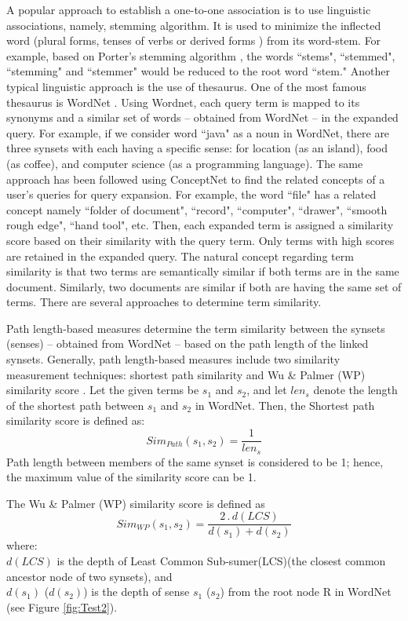 A popular approach to establish a one-to-one association is to use linguistic associations, namely, stemming algorithm. It is used to minimize the inflected word (plural forms, tenses of verbs or derived forms ) from its word-stem. For example, based on Porter's stemming algorithm \cite{porter1980algorithm}, the words ``stems", ``stemmed", ``stemming" and ``stemmer" would be reduced to the root word ``stem." Another typical linguistic approach is the use of thesaurus. One of the most famous thesaurus is WordNet \cite{voorhees1994query}. Using Wordnet, each query term is mapped to its synonyms and a similar set of words -- obtained from WordNet -- in the expanded query. For example, if we consider word ``java" as a noun  in WordNet, there are three synsets with  each having a specific sense: for location (as an island), food (as coffee), and computer science (as a programming language). The same approach has been followed using ConceptNet \cite{hsu2006query} to find the related concepts of a user's queries for query expansion. For example, the word ``file" has a related concept namely ``folder of document", ``record", ``computer", ``drawer", ``smooth rough edge", ``hand tool", etc. Then, each expanded term is assigned a similarity score based on their similarity with the query term. Only terms with high scores are retained in the expanded query.  The natural concept regarding term similarity is that two terms are semantically similar if both terms are in the same document. Similarly, two documents are similar if both are having the same set of terms. There are several approaches to determine term similarity. 

Path length-based measures determine the term similarity between the synsets (senses) -- obtained from WordNet -- based on the path length of the linked synsets. Generally, path length-based measures include two similarity measurement techniques: shortest path similarity \cite{resnik1995using} and  Wu \& Palmer (WP) similarity score \cite{wu1994verbs}. Let the given terms be \emph{$s_1$} and \emph{$s_2$}, and let $len_s$ denote the length of the shortest path between \emph{$s_1$} and \emph{$s_2$} in WordNet. Then, the Shortest path similarity score \cite{resnik1995using} is defined as:
\begin{equation}
Sim_{Path}( s_1, s_2)=\dfrac{1}{len_s} 
\end{equation}
Path length between members of the same synset is considered to be 1; hence, the maximum value of the similarity score can be 1.

The Wu \& Palmer (WP) similarity score \cite{wu1994verbs} is defined as
\begin{equation}
Sim_{WP}( s_1, s_2) = \dfrac{2\,.\,d(LCS)}{d(s_1)+d(s_2)}
\end{equation}
where: \\$d(LCS)$ is the depth of Least Common Sub-sumer(LCS)(the closest common ancestor node of two synsets), and\\$d(s_1)$ ($d(s_2)$) is the depth of sense $s_1$ ($s_2$) from the root node R in WordNet (see Figure \ref{fig:Test2}). 

